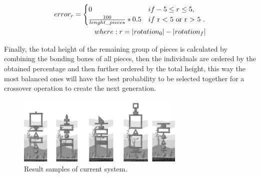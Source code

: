 \documentclass[graybox]{svmult}
\begin{document}
\begin{equation}
    \begin{aligned}
    error_{r} = 
        \begin{cases}
            0 & if -5 \le r \le 5, \\
            \frac{100}{lenght\_pieces} * 0.5 & if $ r < 5 or r > 5 $.
        \end{cases} \\
    where: r= |rotation_0| - |rotation_f|   
    \end{aligned}
\end{equation}



Finally, the total height of the remaining group of pieces is calculated by combining the bonding boxes of all pieces, then the individuals are ordered by the obtained percentage and then further ordered by the total height, this way the most balanced ones will have the best probability to be selected together for a crossover operation to create the next generation.

\begin{figure}[htbp]
\centerline{\includegraphics[width=80mm]{Images/result_example.png}}
\caption{Result samples of current system.}
\label{fig}
\end{figure}
\end{document}
